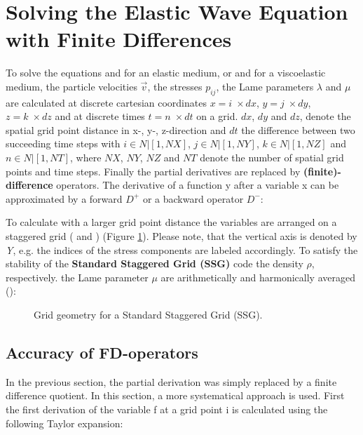 \documentclass[11pt,onecolumn,oneside]{article}
\begin{document}
\section{Solving the Elastic Wave Equation with Finite Differences}
To solve the equations  and  for an elastic medium, or  and  for a viscoelastic medium, the particle velocities $\vec{v}$, the stresses $p_{ij}$, the Lame parameters $\lambda$ and $\mu$ are calculated at  discrete cartesian coordinates  $x=i\; \times dx$, $y=j\; \times dy$, $z=k\; \times dz$ and at discrete times $t=n\; \times dt$ on a grid. $dx$, $dy$ and $dz$, denote  the spatial grid point distance in x-, y-, z-direction and $dt$ the difference between two succeeding time steps with $i \in N | [1,NX]$, $j \in N | [1,NY]$, $k \in N | [1,NZ]$ 
and $n \in N | [1,NT]$, where $NX$, $NY$, $NZ$ and $NT$ denote the number of spatial grid points and time steps. Finally the partial derivatives  are replaced by {\bf{(finite)-difference}} operators. The derivative of a function y after a variable x can be approximated by a forward $D^+$ or a backward operator $D^-$:


To calculate with a larger grid point distance the variables are arranged on a staggered grid (\cite{virieux:86} and \cite{levander:88}) (Figure \ref{fig_cell}).  Please note, that the vertical axis is denoted by \textit{Y}, e.g. the indices of the stress components are labeled accordingly. To satisfy the stability of the {\bf{Standard Staggered Grid (SSG)}} code the density $\rho$, respectively. the Lame parameter $\mu$ are arithmetically and harmonically averaged (\cite{bohlen:06}):

\begin{figure}[ht]
\begin{center}
\caption{\label{fig_cell} Grid geometry for a Standard Staggered Grid (SSG).}
\end{center}
\end{figure}   

\newpage
\subsection{Accuracy of FD-operators}
In the previous section, the partial derivation was simply replaced by a finite difference quotient. In this section, a more systematical approach  is used. First the first derivation of the variable f at a grid point i is calculated using the following Taylor expansion:
\end{document}
